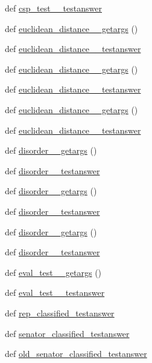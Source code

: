 \begin{DoxyCompactItemize}
def \hyperlink{namespacetests_a303d5da4f7ea83fc59339e73655e041a}{csp\+\_\+test\+\_\+\_\+testanswer}
\item 
def \hyperlink{namespacetests_ace5851ab7b1efcd6988ea8ffef9072ef}{euclidean\+\_\+distance\+\_\+\_\+getargs} ()
\item 
def \hyperlink{namespacetests_a66ba3310024c631f15744c57494700bb}{euclidean\+\_\+distance\+\_\+\_\+testanswer}
\item 
def \hyperlink{namespacetests_a1348622dee4a1e7dde9f35d461b3a80f}{euclidean\+\_\+distance\+\_\+\_\+getargs} ()
\item 
def \hyperlink{namespacetests_abbb19e23f60e213b3207d01a80678040}{euclidean\+\_\+distance\+\_\+\_\+testanswer}
\item 
def \hyperlink{namespacetests_a55c361f0c59924988f46f4361e4edd05}{euclidean\+\_\+distance\+\_\+\_\+getargs} ()
\item 
def \hyperlink{namespacetests_a1a042601eeebab74cb6b3aa0411da7c5}{euclidean\+\_\+distance\+\_\+\_\+testanswer}
\item 
def \hyperlink{namespacetests_a1b4391a6efe7a16fb757bffb745ffe28}{disorder\+\_\+\_\+getargs} ()
\item 
def \hyperlink{namespacetests_aaeff38449dbeb15325350dc17f7e458a}{disorder\+\_\+\_\+testanswer}
\item 
def \hyperlink{namespacetests_ae35920f5eff4963ec26d762ed1d3f6f2}{disorder\+\_\+\_\+getargs} ()
\item 
def \hyperlink{namespacetests_ac68e4415d7adf8402845d28dca2b4f47}{disorder\+\_\+\_\+testanswer}
\item 
def \hyperlink{namespacetests_aa3ada314689dd5c1d68bc7663bdb7ad6}{disorder\+\_\+\_\+getargs} ()
\item 
def \hyperlink{namespacetests_ab8602e277f2ff48c836a4e971bf3b8d5}{disorder\+\_\+\_\+testanswer}
\item 
def \hyperlink{namespacetests_a81cd5f22af1a86986ea56ea079d736f4}{eval\+\_\+test\+\_\+\_\+getargs} ()
\item 
def \hyperlink{namespacetests_a937a06ae476a67ccdf287c7cb50f4b7b}{eval\+\_\+test\+\_\+\_\+testanswer}
\item 
def \hyperlink{namespacetests_a1bd02f3f9c8368a763b8874f55f1ea48}{rep\+\_\+classified\+\_\+testanswer}
\item 
def \hyperlink{namespacetests_a363b99edb38f47371c545fff22ff33fc}{senator\+\_\+classified\+\_\+testanswer}
\item 
def \hyperlink{namespacetests_ae16823a8133ee9d2483fb0a110e89f35}{old\+\_\+senator\+\_\+classified\+\_\+testanswer}
\end{DoxyCompactItemize}
